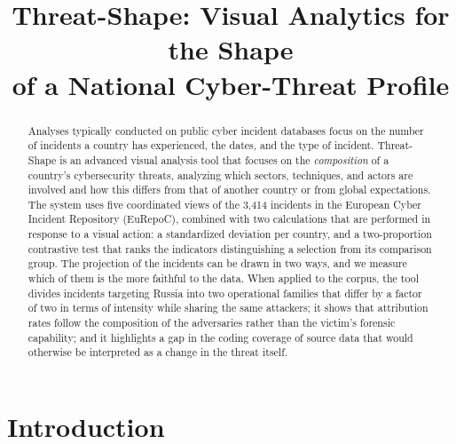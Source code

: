 \documentclass[conference]{IEEEtran}
\begin{document}
\title{Threat-Shape: Visual Analytics for the Shape\\of a National Cyber-Threat Profile}

\author{
\and
{}
}

\maketitle

\begin{abstract}
Analyses typically conducted on public cyber incident databases focus on the number of incidents a country has experienced, the dates, and the type of incident. Threat-Shape is an advanced visual analysis tool that focuses on the \emph{composition} of a country’s cybersecurity threats, analyzing which sectors, techniques, and actors are involved and how this differs from that of another country or from global expectations. The system uses five coordinated views of the 3,414 incidents in the European Cyber Incident Repository (EuRepoC), combined with two calculations that are performed in response to a visual action: a standardized deviation per country, and a two-proportion contrastive test that ranks the indicators distinguishing a selection from its comparison group. The projection of the incidents can be drawn in two ways, and we measure which of them is the more faithful to the data. When applied to the corpus, the tool divides incidents targeting Russia into two operational families that differ by a factor of two in terms of intensity while sharing the same attackers; it shows that attribution rates follow the composition of the adversaries rather than the victim’s forensic capability; and it highlights a gap in the coding coverage of source data that would otherwise be interpreted as a change in the threat itself.
\end{abstract}

\section{Introduction}
\end{document}
